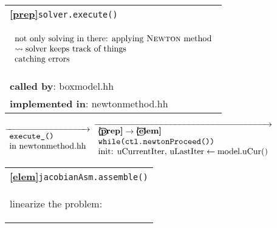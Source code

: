 \begin{landscape}
{%
    \begin{tabular}{|l|}
      \hline
            \textbf{\textcircled{\ref{prep}}}\verb+solver.execute()+ \\
            \begin{scriptsize}$\begin{array}{l}
      \textnormal{not only solving in there: applying \textsc{Newton} method} \\
      \rightsquigarrow\textnormal{solver keeps track of things}\\
      \textnormal{catching errors}
      \end{array}$\end{scriptsize}\\
      \textbf{called by}: boxmodel.hh\\
      \textbf{implemented in}: newtonmethod.hh\\  
    \hline
  \end{tabular}
\nextline
    {
\scriptsize
$\overrightarrow{ \begin{array}{l}
                                  \texttt{execute\_()}\\
				  \textnormal{in newtonmethod.hh}
                                 \end{array}
    }$
    $\overrightarrow{ \begin{array}{l}
				  \textbf{\textcircled{\ref{prep}}} \rightarrow \textbf{\textcircled{\ref{elem}}}\\
                                  \texttt{while(ctl.newtonProceed())}\\
				  \textnormal{init: uCurrentIter, uLastIter} \leftarrow \textnormal{model.uCur()} 
                                 \end{array}
    }$
}
    \begin{tabular}{|l|}
      \hline      
	\textbf{\textcircled{\ref{elem}}}\verb+jacobianAsm.assemble()+ \\
    \begin{scriptsize}linearize the problem:  \end{scriptsize}\\

\end{tabular}}
\end{landscape}
